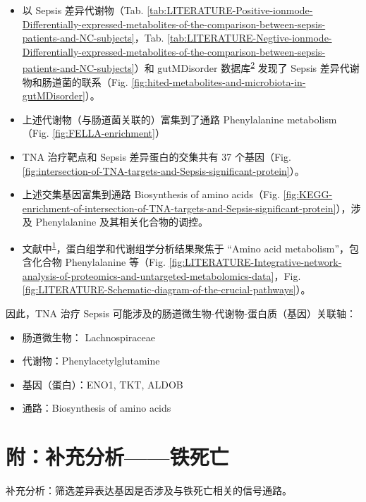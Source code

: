 \documentclass[
]{article}
\providecommand{\tightlist}{%
  \setlength{\itemsep}{0pt}\setlength{\parskip}{0pt}}
\begin{document}
\begin{itemize}
\tightlist
\item
  以 Sepsis 差异代谢物（Tab. \ref{tab:LITERATURE-Positive-ionmode-Differentially-expressed-metabolites-of-the-comparison-between-sepsis-patients-and-NC-subjects}，Tab. \ref{tab:LITERATURE-Negtive-ionmode-Differentially-expressed-metabolites-of-the-comparison-between-sepsis-patients-and-NC-subjects}）和 gutMDisorder 数据库\textsuperscript{\protect\hyperlink{ref-GutmdisorderACheng2019}{2}} 发现了 Sepsis 差异代谢物和肠道菌的联系（Fig. \ref{fig:hited-metabolites-and-microbiota-in-gutMDisorder}）。
\item
  上述代谢物（与肠道菌关联的）富集到了通路 Phenylalanine metabolism（Fig. \ref{fig:FELLA-enrichment}）
\item
  TNA 治疗靶点和 Sepsis 差异蛋白的交集共有 37 个基因（Fig. \ref{fig:intersection-of-TNA-targets-and-Sepsis-significant-protein}）。
\item
  上述交集基因富集到通路 Biosynthesis of amino acids（Fig. \ref{fig:KEGG-enrichment-of-intersection-of-TNA-targets-and-Sepsis-significant-protein}），涉及 Phenylalanine 及其相关化合物的调控。
\item
  文献中\textsuperscript{\protect\hyperlink{ref-IntegrativeAnaChen2022}{1}}，蛋白组学和代谢组学分析结果聚焦于 ``Amino acid metabolism''，包含化合物 Phenylalanine 等（Fig. \ref{fig:LITERATURE-Integrative-network-analysis-of-proteomics-and-untargeted-metabolomics-data}，Fig. \ref{fig:LITERATURE-Schematic-diagram-of-the-crucial-pathways}）。
\end{itemize}

因此，TNA 治疗 Sepsis 可能涉及的肠道微生物-代谢物-蛋白质（基因）关联轴：

\begin{itemize}
\tightlist
\item
  肠道微生物： Lachnospiraceae
\item
  代谢物：Phenylacetylglutamine
\item
  基因（蛋白）：ENO1, TKT, ALDOB
\item
  通路：Biosynthesis of amino acids
\end{itemize}

\hypertarget{Fe}{%
\section{附：补充分析------铁死亡}\label{Fe}}

补充分析：筛选差异表达基因是否涉及与铁死亡相关的信号通路。
\end{document}
